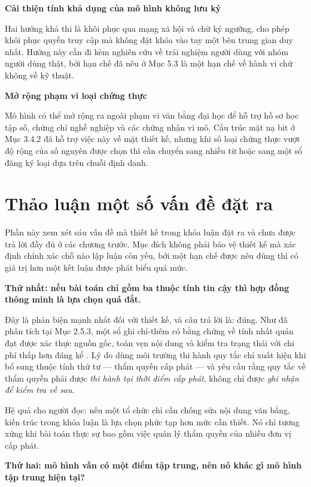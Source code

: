 \noindent \textbf{Cải thiện tính khả dụng của mô hình không lưu ký}

Hai hướng khả thi là khôi phục qua mạng xã hội và chữ ký ngưỡng, cho phép khôi phục quyền truy cập mà không đặt khóa vào tay một bên trung gian duy nhất. Hướng này cần đi kèm nghiên cứu về trải nghiệm người dùng với nhóm người dùng thật, bởi hạn chế đã nêu ở Mục 5.3 là một hạn chế về hành vi chứ không về kỹ thuật.

\noindent \textbf{Mở rộng phạm vi loại chứng thực}

Mô hình có thể mở rộng ra ngoài phạm vi văn bằng đại học để hỗ trợ hồ sơ học tập số, chứng chỉ nghề nghiệp và các chứng nhận vi mô. Cấu trúc mặt nạ bit ở Mục 3.4.2 đã hỗ trợ việc này về mặt thiết kế, nhưng khi số loại chứng thực vượt độ rộng của số nguyên được chọn thì cần chuyển sang nhiều từ hoặc sang một sổ đăng ký loại dựa trên chuỗi định danh.

\section{Thảo luận một số vấn đề đặt ra}

Phần này xem xét sáu vấn đề mà thiết kế trong khóa luận đặt ra và chưa được trả lời đầy đủ ở các chương trước. Mục đích không phải bảo vệ thiết kế mà xác định chính xác chỗ nào lập luận còn yếu, bởi một hạn chế được nêu đúng thì có giá trị hơn một kết luận được phát biểu quá mức.

\noindent \textbf{Thứ nhất: nếu bài toán chỉ gồm ba thuộc tính tin cậy thì hợp đồng thông minh là lựa chọn quá đắt.}

Đây là phản biện mạnh nhất đối với thiết kế, và câu trả lời là: đúng. Như đã phân tích tại Mục 2.5.3, một sổ ghi chỉ-thêm có bằng chứng về tính nhất quán đạt được xác thực nguồn gốc, toàn vẹn nội dung và kiểm tra trạng thái với chi phí thấp hơn đáng kể \cite{RFC6962, Saramago2021}. Lý do dùng môi trường thi hành quy tắc chỉ xuất hiện khi bổ sung thuộc tính thứ tư --- thẩm quyền cấp phát --- và yêu cầu rằng quy tắc về thẩm quyền phải được \emph{thi hành tại thời điểm cấp phát}, không chỉ được \emph{ghi nhận để kiểm tra về sau}.

Hệ quả cho người đọc: nếu một tổ chức chỉ cần chống sửa nội dung văn bằng, kiến trúc trong khóa luận là lựa chọn phức tạp hơn mức cần thiết. Nó chỉ tương xứng khi bài toán thực sự bao gồm việc quản lý thẩm quyền của nhiều đơn vị cấp phát.

\noindent \textbf{Thứ hai: mô hình vẫn có một điểm tập trung, nên nó khác gì mô hình tập trung hiện tại?}

